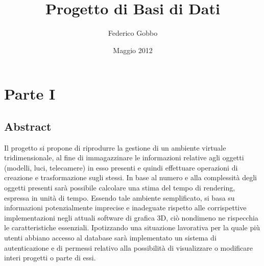 \documentclass[a4paper,12pt]{report}
\title{Progetto di Basi di Dati}
\author{Federico Gobbo}
\date{Maggio 2012}
\begin{document}
\maketitle
\tableofcontents
\chapter{Parte I}
\section{Abstract}
Il progetto si propone di riprodurre la gestione di un ambiente virtuale tridimensionale, al fine di immagazzinare le informazioni relative agli oggetti (modelli, luci, telecamere) in esso presenti e quindi effettuare operazioni di creazione e trasformazione sugli stessi. In base al numero e alla complessità degli oggetti presenti sarà possibile calcolare una stima del tempo di rendering, espressa in unità di tempo. Essendo tale ambiente semplificato, si basa su informazioni potenzialmente imprecise e inadeguate rispetto alle corrispettive implementazioni negli attuali software di grafica 3D, ciò nondimeno ne rispecchia le caratteristiche essenziali. Ipotizzando una situazione lavorativa per la quale più utenti abbiano accesso al database sarà implementato un sistema di autenticazione e di permessi relativo alla possibilità di visualizzare o modificare interi progetti o parte di essi.
\newpage
\end{document}
